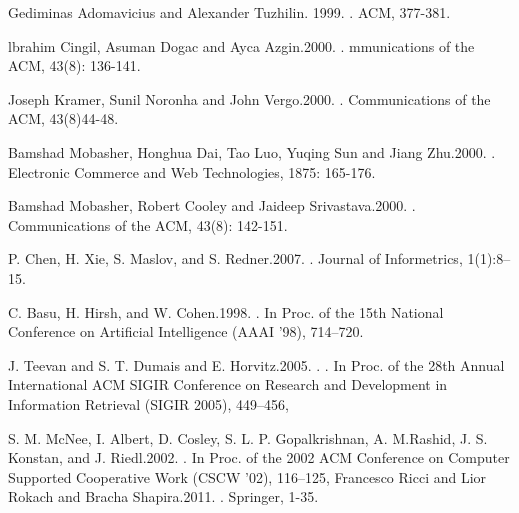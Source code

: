 \begin{thebibliography}{10}

Gediminas Adomavicius and Alexander Tuzhilin. 1999.
.
\newblock ACM, 377-381.

lbrahim Cingil, Asuman Dogac and Ayca Azgin.2000.
.
\newblock mmunications of the ACM, 43(8): 136-141.

Joseph Kramer, Sunil Noronha and John Vergo.2000.
.
\newblock Communications of the ACM, 43(8)44-48.

Bamshad Mobasher, Honghua Dai, Tao Luo, Yuqing Sun and Jiang Zhu.2000.
.
\newblock Electronic Commerce and Web Technologies, 1875: 165-176.

Bamshad Mobasher, Robert Cooley and Jaideep Srivastava.2000.
.
\newblock Communications of the ACM, 43(8): 142-151.

P. Chen, H. Xie, S. Maslov, and S. Redner.2007.
.
\newblock Journal of Informetrics, 1(1):8--15.

C. Basu, H. Hirsh, and W. Cohen.1998.
.
\newblock In Proc. of the 15th National Conference on Artificial Intelligence (AAAI ’98), 714–720.

J. Teevan and S. T. Dumais and E. Horvitz.2005.
.
\newblock . In Proc. of the 28th Annual International ACM SIGIR Conference on Research and Development in Information Retrieval (SIGIR 2005), 449–456,

S. M. McNee, I. Albert, D. Cosley, S. L. P. Gopalkrishnan, A. M.Rashid, J. S. Konstan, and J. Riedl.2002.
.
\newblock  In Proc. of the 2002 ACM Conference on Computer Supported Cooperative Work (CSCW ’02), 116–125,
Francesco Ricci and Lior Rokach and Bracha Shapira.2011.
.
\newblock Springer, 1-35. 


\end{thebibliography}
